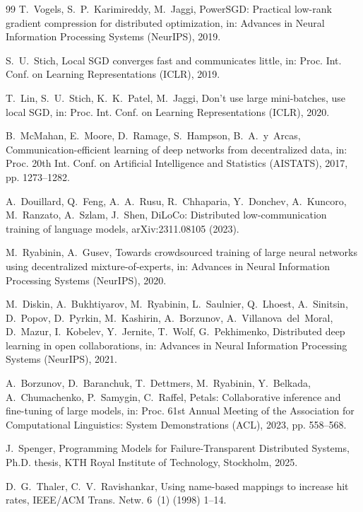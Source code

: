 \documentclass[5p,times,twocolumn]{elsarticle}
\begin{document}
\begin{thebibliography}{99}
 T.~Vogels, S.~P.~Karimireddy, M.~Jaggi, PowerSGD: Practical low-rank gradient compression for distributed optimization, in: Advances in Neural Information Processing Systems (NeurIPS), 2019.

 S.~U.~Stich, Local SGD converges fast and communicates little, in: Proc. Int. Conf. on Learning Representations (ICLR), 2019.

 T.~Lin, S.~U.~Stich, K.~K.~Patel, M.~Jaggi, Don't use large mini-batches, use local SGD, in: Proc. Int. Conf. on Learning Representations (ICLR), 2020.

 B.~McMahan, E.~Moore, D.~Ramage, S.~Hampson, B.~A.~y~Arcas, Communication-efficient learning of deep networks from decentralized data, in: Proc. 20th Int. Conf. on Artificial Intelligence and Statistics (AISTATS), 2017, pp. 1273--1282.

 A.~Douillard, Q.~Feng, A.~A.~Rusu, R.~Chhaparia, Y.~Donchev, A.~Kuncoro, M.~Ranzato, A.~Szlam, J.~Shen, DiLoCo: Distributed low-communication training of language models, arXiv:2311.08105 (2023).

 M.~Ryabinin, A.~Gusev, Towards crowdsourced training of large neural networks using decentralized mixture-of-experts, in: Advances in Neural Information Processing Systems (NeurIPS), 2020.

 M.~Diskin, A.~Bukhtiyarov, M.~Ryabinin, L.~Saulnier, Q.~Lhoest, A.~Sinitsin, D.~Popov, D.~Pyrkin, M.~Kashirin, A.~Borzunov, A.~Villanova~del~Moral, D.~Mazur, I.~Kobelev, Y.~Jernite, T.~Wolf, G.~Pekhimenko, Distributed deep learning in open collaborations, in: Advances in Neural Information Processing Systems (NeurIPS), 2021.

 A.~Borzunov, D.~Baranchuk, T.~Dettmers, M.~Ryabinin, Y.~Belkada, A.~Chumachenko, P.~Samygin, C.~Raffel, Petals: Collaborative inference and fine-tuning of large models, in: Proc. 61st Annual Meeting of the Association for Computational Linguistics: System Demonstrations (ACL), 2023, pp. 558--568.

 J.~Spenger, Programming Models for Failure-Transparent Distributed Systems, Ph.D. thesis, KTH Royal Institute of Technology, Stockholm, 2025.

 D.~G.~Thaler, C.~V.~Ravishankar, Using name-based mappings to increase hit rates, IEEE/ACM Trans. Netw. 6~(1) (1998) 1--14.


\end{thebibliography}
\end{document}
